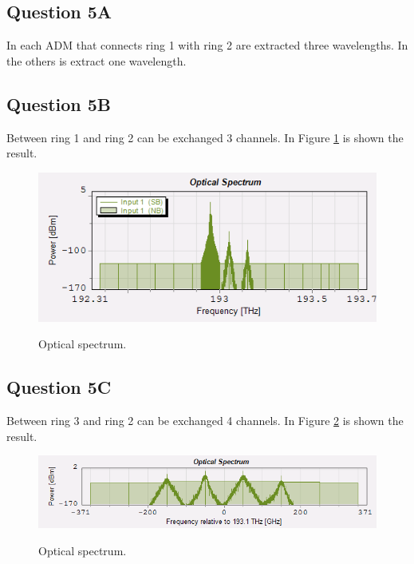 \documentclass[a4paper,10pt]{report}
\begin{document}
\subsection*{Question 5A}
In each ADM that connects ring 1 with ring 2 are extracted three wavelengths.
In the others is extract one wavelength.

\subsection*{Question 5B}
Between ring 1 and ring 2 can be exchanged 3 channels.
In Figure \ref{q5b} is shown the result.

\begin{figure}[!ht]
   \centering
   \includegraphics[width=12cm]{q5b.png}\\
   \caption{Optical spectrum.}
   \label{q5b}
\end{figure}

\subsection*{Question 5C}
Between ring 3 and ring 2 can be exchanged 4 channels.
In Figure \ref{q5c} is shown the result.

\begin{figure}[!ht]
   \centering
   \includegraphics[width=12cm]{q5c.png}\\
   \caption{Optical spectrum.}
   \label{q5c}
\end{figure}
\end{document}
